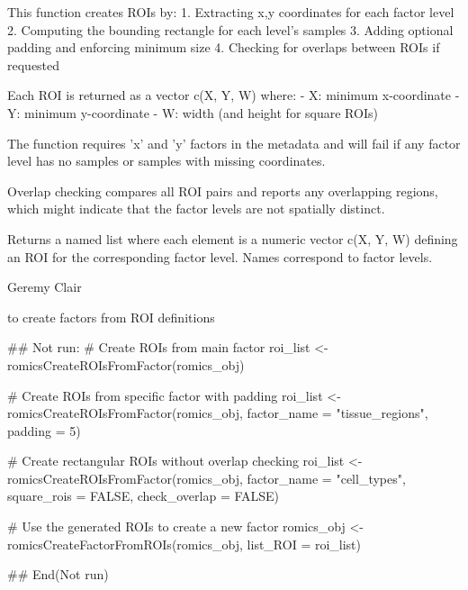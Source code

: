 \documentclass[a4paper]{book}
\begin{document}
%
\begin{Details}
This function creates ROIs by:
1. Extracting x,y coordinates for each factor level
2. Computing the bounding rectangle for each level's samples
3. Adding optional padding and enforcing minimum size
4. Checking for overlaps between ROIs if requested

Each ROI is returned as a vector c(X, Y, W) where:
- X: minimum x-coordinate
- Y: minimum y-coordinate
- W: width (and height for square ROIs)

The function requires 'x' and 'y' factors in the metadata and will fail if
any factor level has no samples or samples with missing coordinates.

Overlap checking compares all ROI pairs and reports any overlapping regions,
which might indicate that the factor levels are not spatially distinct.
\end{Details}
%
\begin{Value}
Returns a named list where each element is a numeric vector c(X, Y, W) defining
an ROI for the corresponding factor level. Names correspond to factor levels.
\end{Value}
%
\begin{Author}
Geremy Clair
\end{Author}
%
\begin{SeeAlso}
 to create factors from ROI definitions
\end{SeeAlso}
%
\begin{Examples}
\begin{ExampleCode}
## Not run: 
# Create ROIs from main factor
roi_list <- romicsCreateROIsFromFactor(romics_obj)

# Create ROIs from specific factor with padding
roi_list <- romicsCreateROIsFromFactor(romics_obj,
                                       factor_name = "tissue_regions",
                                       padding = 5)

# Create rectangular ROIs without overlap checking
roi_list <- romicsCreateROIsFromFactor(romics_obj,
                                       factor_name = "cell_types",
                                       square_rois = FALSE,
                                       check_overlap = FALSE)

# Use the generated ROIs to create a new factor
romics_obj <- romicsCreateFactorFromROIs(romics_obj, list_ROI = roi_list)

## End(Not run)
\end{ExampleCode}
\end{Examples}
\end{document}
